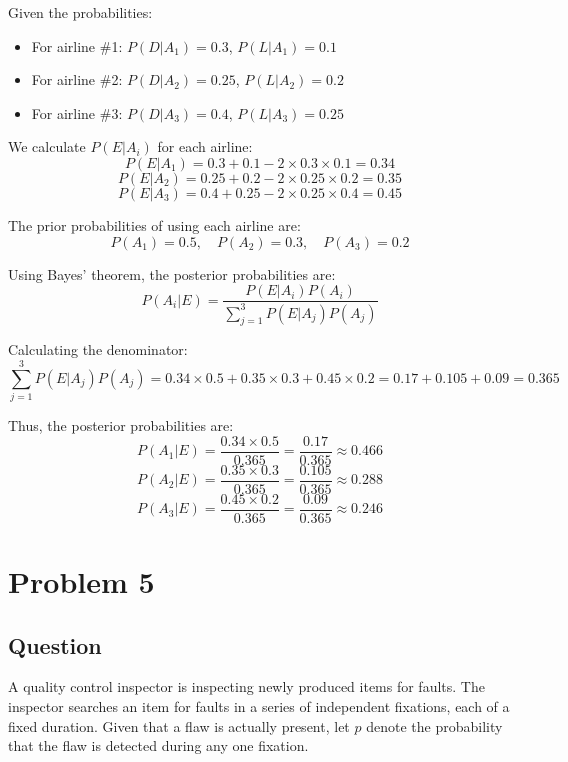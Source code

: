 \documentclass{article}
\begin{document}
Given the probabilities:
\begin{itemize}
    \item For airline \#1: $P(D|A_1) = 0.3$, $P(L|A_1) = 0.1$
    \item For airline \#2: $P(D|A_2) = 0.25$, $P(L|A_2) = 0.2$
    \item For airline \#3: $P(D|A_3) = 0.4$, $P(L|A_3) = 0.25$
\end{itemize}

We calculate $P(E|A_i)$ for each airline:
\[
P(E|A_1) = 0.3 + 0.1 - 2 \times 0.3 \times 0.1 = 0.34
\]
\[
P(E|A_2) = 0.25 + 0.2 - 2 \times 0.25 \times 0.2 = 0.35
\]
\[
P(E|A_3) = 0.4 + 0.25 - 2 \times 0.25 \times 0.4 = 0.45
\]

The prior probabilities of using each airline are:
\[
P(A_1) = 0.5, \quad P(A_2) = 0.3, \quad P(A_3) = 0.2
\]

Using Bayes' theorem, the posterior probabilities are:
\[
P(A_i|E) = \frac{P(E|A_i)P(A_i)}{\sum_{j=1}^{3} P(E|A_j)P(A_j)}
\]

Calculating the denominator:
\[
\sum_{j=1}^{3} P(E|A_j)P(A_j) = 0.34 \times 0.5 + 0.35 \times 0.3 + 0.45 \times 0.2 = 0.17 + 0.105 + 0.09 = 0.365
\]

Thus, the posterior probabilities are:
\[
P(A_1|E) = \frac{0.34 \times 0.5}{0.365} = \frac{0.17}{0.365} \approx 0.466
\]
\[
P(A_2|E) = \frac{0.35 \times 0.3}{0.365} = \frac{0.105}{0.365} \approx 0.288
\]
\[
P(A_3|E) = \frac{0.45 \times 0.2}{0.365} = \frac{0.09}{0.365} \approx 0.246
\]
\section*{Problem 5}
\subsection*{Question}
A quality control inspector is inspecting newly produced items for faults. The inspector searches an item for faults in a series of independent fixations, each of a fixed duration. Given that a flaw is actually present, let $p$ denote the probability that the flaw is detected during any one fixation.
\end{document}
